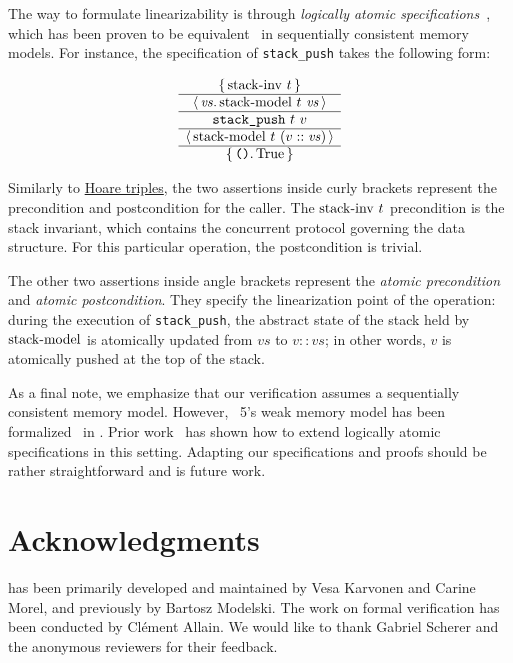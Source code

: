 \documentclass[a4paper, 11pt]{article}
\begin{document}
The \Iris way to formulate linearizability is through \emph{logically atomic specifications}~\cite{DBLP:conf/ecoop/PintoDG14}, which has been proven to be equivalent~\cite{DBLP:journals/pacmpl/BirkedalDGJST21} in sequentially consistent memory models.
For instance, the specification of \texttt{stack\_push} takes the following form:

\[
  \begin{array}{c} \left\lbrace\, 
    \mathrm{stack {\hbox{-}} inv}\ t
   \,\right\rbrace \\ \hline \left\langle\, 
    \mathit{vs}
   \ldotp 
    \mathrm{stack {\hbox{-}} model}\ t\  \mathit{vs}
   \,\right\rangle \\ \hline 
    \texttt{stack\_push}\ t\ v
   \\ \hline \left\langle\, 
    \mathrm{stack {\hbox{-}} model}\ t\  (v :: \mathit{vs})
   \,\right\rangle \\ \hline \left\lbrace\, 
    \texttt{()}
   \ldotp 
    \mathrm{True}
   \,\right\rbrace \end{array}
\]

Similarly to \href{https://en.wikipedia.org/wiki/Hoare_logic}{Hoare triples}, the two assertions inside curly brackets represent the precondition and postcondition for the caller.
The $\mathrm{stack {\hbox{-}} inv}\ t$ precondition is the stack invariant, which contains the concurrent protocol governing the data structure.
For this particular operation, the postcondition is trivial.

The other two assertions inside angle brackets represent the \emph{atomic precondition} and \emph{atomic postcondition}.
They specify the linearization point of the operation: during the execution of \texttt{stack\_push}, the abstract state of the stack held by $\mathrm{stack {\hbox{-}} model}$ is atomically updated from $\mathit{vs}$ to $v :: \mathit{vs}$; in other words, $v$ is atomically pushed at the top of the stack.

As a final note, we emphasize that our verification assumes a sequentially consistent memory model.
However, \OCaml~5's weak memory model has been formalized~\cite{DBLP:journals/pacmpl/MevelJP20} in \Iris.
Prior work~\cite{DBLP:journals/pacmpl/MevelJ21} has shown how to extend logically atomic specifications in this setting.
Adapting our specifications and proofs should be rather straightforward and is future work.

\section{Acknowledgments}

\Saturn has been primarily developed and maintained by Vesa Karvonen and Carine Morel, and previously by Bartosz Modelski. The work on formal verification has been conducted by Clément Allain. We would like to thank Gabriel Scherer and the anonymous reviewers for their feedback.

\printbibliography
\end{document}
